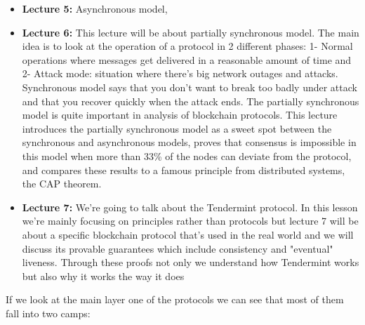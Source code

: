 \begin{itemize}
    \item \textbf{Lecture 5: }Asynchronous model, 
    \item \textbf{Lecture 6: } This lecture will be about partially synchronous model. The main idea is to look at the operation of a protocol in 2 different phases: 1- Normal operations where messages get delivered in a reasonable amount of time and 2- Attack mode: situation where there's big network outages and attacks. Synchronous model says that you don't want to break too badly under attack and that you recover quickly when the attack ends. The partially synchronous model is quite important in analysis of blockchain protocols. This lecture  introduces the partially synchronous model as a sweet spot between the
    synchronous and asynchronous models, proves that consensus is impossible in this
    model when more than 33\% of the nodes can deviate from the protocol, and compares
    these results to a famous principle from distributed systems, the CAP theorem. 
    \item \textbf{Lecture 7: } We're going to talk about the Tendermint protocol. In this lesson we're mainly focusing on principles rather than protocols but lecture 7 will be about a specific blockchain protocol that's used in the real world and we will discuss its provable guarantees which include consistency and "eventual" liveness. Through these proofs not only we understand how Tendermint works but also why it works the way it does
\end{itemize}

If we look at the main layer one of the protocols we can see that most of them fall into two camps:

